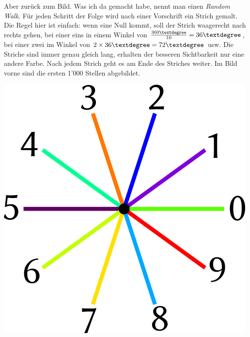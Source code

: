 Aber zurück zum Bild. Was ich da gemacht habe, nennt man einen \textit{Random Walk}. Für jeden Schritt der Folge wird nach einer Vorschrift ein Strich gemalt. Die Regel hier ist einfach: wenn eine Null kommt, soll der Strich waagerecht nach rechts gehen, bei einer eins in einem Winkel von $\frac{360\textdegree}{10}=36\textdegree$, bei einer zwei im Winkel von $2\times36\textdegree=72\textdegree$ usw. Die Striche sind immer genau gleich lang, erhalten der besseren Sichtbarkeit nur eine andere Farbe. Nach jedem Strich geht es am Ende des Striches weiter. Im Bild vorne sind die ersten 1'000 Stellen abgebildet.

\begin{center}
\includegraphics[width=.3\textwidth]{./bilder/kreis.png}
\end{center}
\newpage
